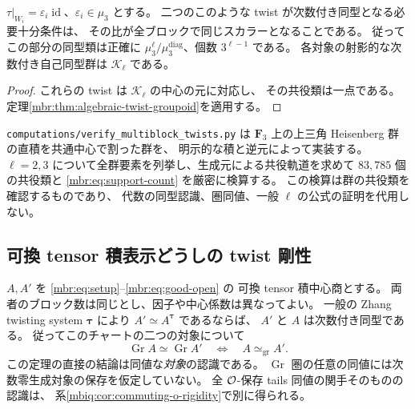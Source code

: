 \begin{corollary}
\label{mbr:cor:scalar-roots}
$\tau|_{W_i}=\varepsilon_i\operatorname{id}$、$\varepsilon_i\in\mu_3$ とする。
二つのこのような twist が次数付き同型となる必要十分条件は、
その比が全ブロックで同じスカラーとなることである。
従ってこの部分の同型類は正確に
$\mu_3^\ell/\mu_3^{\mathrm{diag}}$、個数 $3^{\ell-1}$ である。
各対象の射影的な次数付き自己同型群は $\mathcal K_\ell$ である。
\end{corollary}
\begin{proof}
これらの twist は $\mathcal K_\ell$ の中心の元に対応し、
その共役類は一点である。
定理\ref{mbr:thm:algebraic-twist-groupoid}を適用する。
\end{proof}

\begin{remark}[有限検算と証明の区別]\label{mbr:rem:verification}
\texttt{computations/verify\_multiblock\_twists.py} は
$\mathbf F_3$ 上の上三角 Heisenberg 群の直積を共通中心で割った群を、
明示的な積と逆元によって実装する。
$\ell=2,3$ について全群要素を列挙し、生成元による共役軌道を求めて
$83,785$ 個の共役類と \eqref{mbr:eq:support-count} を厳密に検算する。
この検算は群の共役類を確認するものであり、
代数の同型認識、圏同値、一般 $\ell$ の公式の証明を代用しない。
\end{remark}

\subsection{可換 tensor 積表示どうしの twist 剛性}

\begin{theorem}
\label{mbr:thm:commuting-twist-rigidity}
$A,A'$ を \eqref{mbr:eq:setup}--\eqref{mbr:eq:good-open} の
可換 tensor 積中心商とする。
両者のブロック数は同じとし、因子や中心係数は異なってよい。
一般の Zhang twisting system $\boldsymbol\tau$ により
$A'\simeq A^{\boldsymbol\tau}$ であるならば、
$A'$ と $A$ は次数付き同型である。
従ってこのチャートの二つの対象について
\begin{equation}\label{mbr:eq:graded-category-rigidity}
 \operatorname{Gr}A\simeq\operatorname{Gr}A'
 \quad\Longleftrightarrow\quad
 A\simeq_{\mathrm{gr}} A'.
\end{equation}
この定理の直接の結論は同値な\emph{対象}の認識である。
$\operatorname{Gr}$ 圏の任意の同値には次数零生成対象の保存を仮定していない。
全 $\mathcal O$-保存 tails 同値の関手そのものの認識は、
系\ref{mbiq:cor:commuting-o-rigidity}で別に得られる。
\end{theorem}

